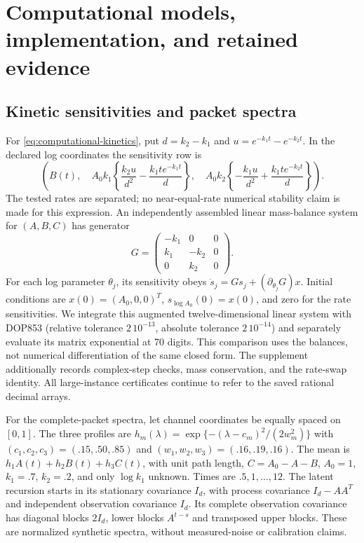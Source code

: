 \section{Computational models, implementation, and retained evidence}
\label{app:computational-models}

\subsection{Kinetic sensitivities and packet spectra}

For \eqref{eq:computational-kinetics}, put $d=k_2-k_1$ and
$u=e^{-k_1t}-e^{-k_2t}$. In the declared log coordinates the sensitivity row is
\begin{equation}\label{eq:kinetic-sensitivity-row}
 \left(
 B(t),\quad
 A_0k_1\left\{\frac{k_2u}{d^2}-\frac{k_1t e^{-k_1t}}d\right\},\quad
 A_0k_2\left\{-\frac{k_1u}{d^2}+\frac{k_1t e^{-k_2t}}d\right\}
 \right).
\end{equation}
The tested rates are separated; no near-equal-rate numerical stability claim
is made for this expression. An independently assembled linear mass-balance
system for $(A,B,C)$ has generator
\[
 G=\begin{pmatrix}-k_1&0&0\\k_1&-k_2&0\\0&k_2&0\end{pmatrix}.
\]
For each log parameter $\theta_j$, its sensitivity obeys
$\dot s_j=Gs_j+(\partial_{\theta_j}G)x$.
Initial conditions are $x(0)=(A_0,0,0)^T$,
$s_{\log A_0}(0)=x(0)$, and zero for the rate sensitivities.
We integrate this augmented twelve-dimensional linear system with DOP853
(relative tolerance $2\,10^{-13}$, absolute tolerance $2\,10^{-14}$)
and separately evaluate its matrix exponential at 70 digits. This comparison
uses the balances, not numerical differentiation of the same closed form.
The supplement additionally records complex-step checks, mass conservation,
and the rate-swap identity. All large-instance certificates continue to refer
to the saved rational decimal arrays.

For the complete-packet spectra, let channel coordinates be equally spaced
on $[0,1]$. The three profiles are
$h_m(\lambda)=\exp\{-(\lambda-c_m)^2/(2w_m^2)\}$ with
$(c_1,c_2,c_3)=(.15,.50,.85)$ and $(w_1,w_2,w_3)=(.16,.19,.16)$.
The mean is $h_1A(t)+h_2B(t)+h_3C(t)$, with unit path length,
$C=A_0-A-B$, $A_0=1$, $k_1=.7$, $k_2=.2$, and only $\log k_1$
unknown. Times are $.5,1,\ldots,12$. The latent recursion starts in its
stationary covariance $I_d$, with process covariance $I_d-AA^T$ and
independent observation covariance $I_d$. Its complete observation covariance
has diagonal blocks $2I_d$, lower blocks $A^{t-s}$ and transposed upper blocks.
These are normalized synthetic spectra, without measured-noise or calibration
claims.

